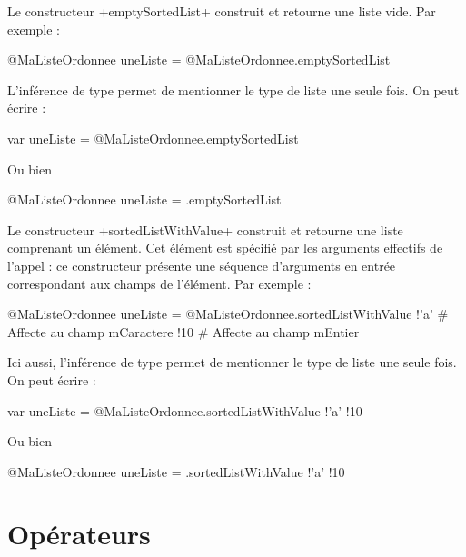 
Le constructeur \ggsq+emptySortedList+ construit et retourne une liste vide. Par exemple :
\begin{galgas4}
@MaListeOrdonnee uneListe = @MaListeOrdonnee.emptySortedList
\end{galgas4}

L'inférence de type permet de mentionner le type de liste une seule fois. On peut écrire :
\begin{galgas4}
var uneListe = @MaListeOrdonnee.emptySortedList
\end{galgas4}

Ou bien
\begin{galgas4}
@MaListeOrdonnee uneListe = .emptySortedList
\end{galgas4}



Le constructeur \ggsq+sortedListWithValue+ construit et retourne une liste comprenant un élément. Cet élément est spécifié par les arguments effectifs de l'appel : ce constructeur présente une séquence d'arguments en entrée correspondant aux champs de l'élément. Par exemple :

\begin{galgas4}
@MaListeOrdonnee uneListe = @MaListeOrdonnee.sortedListWithValue {
  !'a' # Affecte au champ mCaractere
  !10  # Affecte au champ mEntier
}
\end{galgas4}

Ici aussi, l'inférence de type permet de mentionner le type de liste une seule fois. On peut écrire :
\begin{galgas4}
var uneListe = @MaListeOrdonnee.sortedListWithValue {!'a' !10}

\end{galgas4}

Ou bien
\begin{galgas4}
@MaListeOrdonnee uneListe = .sortedListWithValue {!'a' !10}
\end{galgas4}









\section{Opérateurs}







